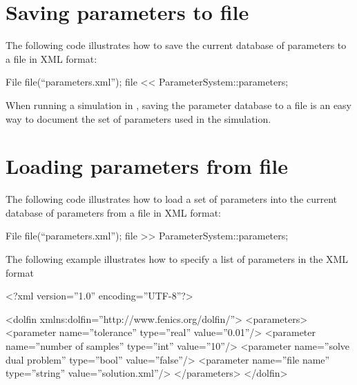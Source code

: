\section{Saving parameters to file}

The following code illustrates how to save the current database of
parameters to a file in \dolfin{} XML format:
\begin{code}
File file(``parameters.xml'');
file << ParameterSystem::parameters;
\end{code}
When running a simulation in \dolfin{}, saving the parameter database
to a file is an easy way to document the set of parameters used in the
simulation.

\section{Loading parameters from file}

The following code illustrates how to load a set of parameters into
the current database of parameters from a file in \dolfin{} XML format:
\begin{code}
File file(``parameters.xml'');
file >> ParameterSystem::parameters;
\end{code}
The following example illustrates how to specify a list of parameters
in the \dolfin{} XML format
\footnotesize
\begin{code}
<?xml version=''1.0'' encoding=''UTF-8''?> 

<dolfin xmlns:dolfin=''http://www.fenics.org/dolfin/''> 
  <parameters>
    <parameter name=''tolerance'' type=''real'' value=''0.01''/>
    <parameter name=''number of samples'' type=''int'' value=''10''/>
    <parameter name=''solve dual problem'' type=''bool'' value=''false''/>
    <parameter name=''file name'' type=''string'' value=''solution.xml''/>
  </parameters>
</dolfin>
\end{code}
\normalsize
